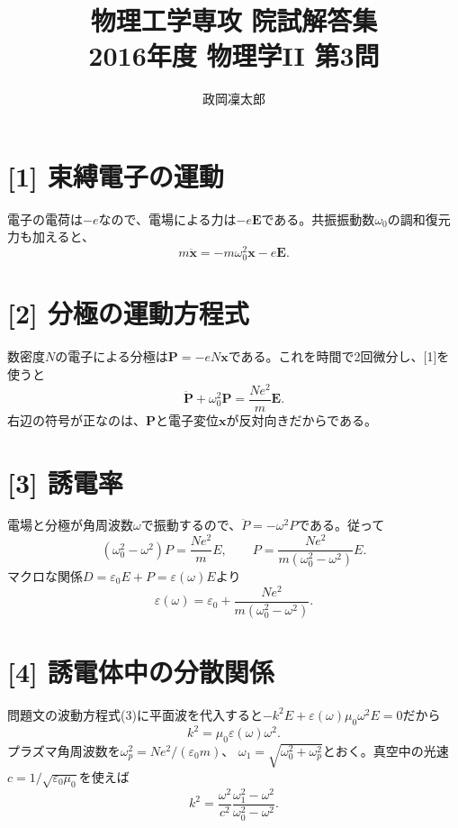 \documentclass[11pt,a4paper]{article}
\title{物理工学専攻 院試解答集\\2016年度 物理学II 第3問}
\author{政岡凜太郎}
\date{}
\begin{document}
\maketitle

\section*{[1] 束縛電子の運動}
電子の電荷は$-e$なので、電場による力は$-e\boldsymbol E$である。共振振動数$\omega_0$の調和復元力も加えると、
\begin{equation}
  \boxed{m\ddot{\boldsymbol x}=-m\omega_0^2\boldsymbol x-e\boldsymbol E.}
\end{equation}

\section*{[2] 分極の運動方程式}
数密度$N$の電子による分極は$\boldsymbol P=-eN\boldsymbol x$である。これを時間で2回微分し、[1]を使うと
\begin{equation}
  \boxed{\ddot{\boldsymbol P}+\omega_0^2\boldsymbol P
  =\frac{Ne^2}{m}\boldsymbol E.}
\end{equation}
右辺の符号が正なのは、$\boldsymbol P$と電子変位$\boldsymbol x$が反対向きだからである。

\section*{[3] 誘電率}
電場と分極が角周波数$\omega$で振動するので、$\ddot P=-\omega^2P$である。従って
\begin{equation}
  (\omega_0^2-\omega^2)P=\frac{Ne^2}{m}E,
  \qquad
  \boxed{P=\frac{Ne^2}{m(\omega_0^2-\omega^2)}E}.
\end{equation}
マクロな関係$D=\varepsilon_0E+P=\varepsilon(\omega)E$より
\begin{equation}
  \varepsilon(\omega)=\varepsilon_0+
  \frac{Ne^2}{m(\omega_0^2-\omega^2)}.
\end{equation}

\section*{[4] 誘電体中の分散関係}
問題文の波動方程式(3)に平面波を代入すると$-k^2E+\varepsilon(\omega)\mu_0\omega^2E=0$だから
\begin{equation}
  \boxed{k^2=\mu_0\varepsilon(\omega)\omega^2}.
\end{equation}
プラズマ角周波数を$\omega_p^2=Ne^2/(\varepsilon_0m)$、
$\omega_1=\sqrt{\omega_0^2+\omega_p^2}$とおく。真空中の光速$c=1/\sqrt{\varepsilon_0\mu_0}$を使えば
\begin{equation}
  \boxed{k^2=\frac{\omega^2}{c^2}
  \frac{\omega_1^2-\omega^2}{\omega_0^2-\omega^2}}.
\end{equation}
\end{document}
